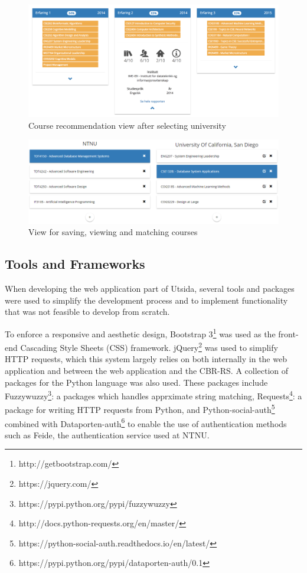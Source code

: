 \begin{figure}[h]
    \centering
    \includegraphics[width=1\textwidth]{fig/utsida_screenshots/result_2_cut_high.png}
    \caption[Course recommendation view]{Course recommendation view after selecting university}
    \label{fig:web_results_2}
\end{figure}

\begin{figure}[H]
    \centering
    \includegraphics[width=1\textwidth]{fig/utsida_screenshots/course_match_cut.png}
    \caption{View for saving, viewing and matching courses}
    \label{fig:web_courses}
\end{figure}

\subsection{Tools and Frameworks}

When developing the web application part of Utsida, several tools and packages were used to simplify the development process and to implement functionality that was not feasible to develop from scratch.

To enforce a responsive and aesthetic design, Bootstrap 3\footnote{http://getbootstrap.com/} was used as the front-end Cascading Style Sheets (CSS) framework. jQuery\footnote{https://jquery.com/} was used to simplify HTTP requests, which this system largely relies on both internally in the web application and between the web application and the CBR-RS. A collection of packages for the Python language was also used. These packages include Fuzzywuzzy\footnote{https://pypi.python.org/pypi/fuzzywuzzy}: a packages which handles apprximate string matching, Requests\footnote{http://docs.python-requests.org/en/master/}: a package for writing HTTP requests from Python, and Python-social-auth\footnote{https://python-social-auth.readthedocs.io/en/latest/} combined with Dataporten-auth\footnote{https://pypi.python.org/pypi/dataporten-auth/0.1} to enable the use of authentication methods such as Feide, the authentication service used at NTNU.

